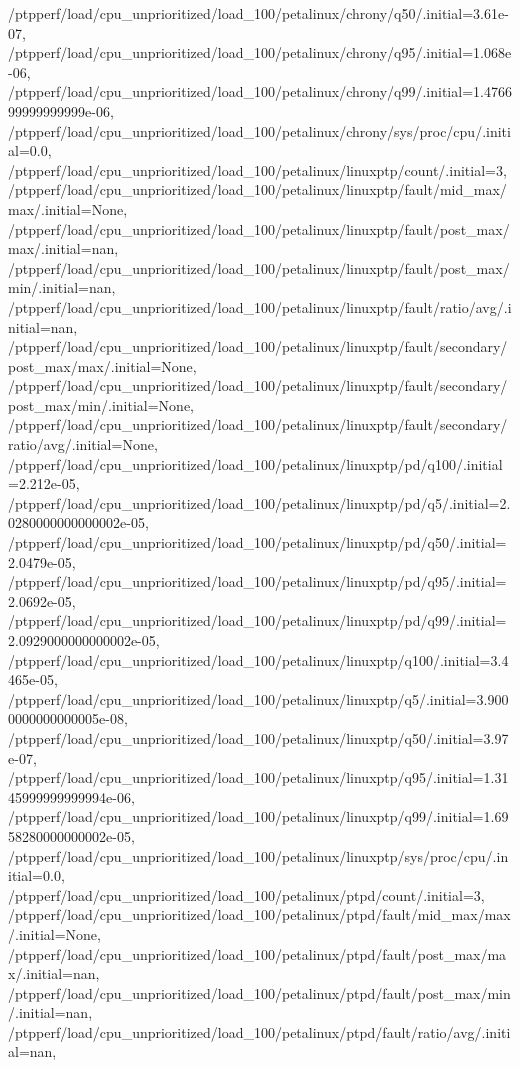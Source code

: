 {    /ptpperf/load/cpu_unprioritized/load_100/petalinux/chrony/q50/.initial=3.61e-07,
    /ptpperf/load/cpu_unprioritized/load_100/petalinux/chrony/q95/.initial=1.068e-06,
    /ptpperf/load/cpu_unprioritized/load_100/petalinux/chrony/q99/.initial=1.476699999999999e-06,
    /ptpperf/load/cpu_unprioritized/load_100/petalinux/chrony/sys/proc/cpu/.initial=0.0,
    /ptpperf/load/cpu_unprioritized/load_100/petalinux/linuxptp/count/.initial=3,
    /ptpperf/load/cpu_unprioritized/load_100/petalinux/linuxptp/fault/mid_max/max/.initial=None,
    /ptpperf/load/cpu_unprioritized/load_100/petalinux/linuxptp/fault/post_max/max/.initial=nan,
    /ptpperf/load/cpu_unprioritized/load_100/petalinux/linuxptp/fault/post_max/min/.initial=nan,
    /ptpperf/load/cpu_unprioritized/load_100/petalinux/linuxptp/fault/ratio/avg/.initial=nan,
    /ptpperf/load/cpu_unprioritized/load_100/petalinux/linuxptp/fault/secondary/post_max/max/.initial=None,
    /ptpperf/load/cpu_unprioritized/load_100/petalinux/linuxptp/fault/secondary/post_max/min/.initial=None,
    /ptpperf/load/cpu_unprioritized/load_100/petalinux/linuxptp/fault/secondary/ratio/avg/.initial=None,
    /ptpperf/load/cpu_unprioritized/load_100/petalinux/linuxptp/pd/q100/.initial=2.212e-05,
    /ptpperf/load/cpu_unprioritized/load_100/petalinux/linuxptp/pd/q5/.initial=2.0280000000000002e-05,
    /ptpperf/load/cpu_unprioritized/load_100/petalinux/linuxptp/pd/q50/.initial=2.0479e-05,
    /ptpperf/load/cpu_unprioritized/load_100/petalinux/linuxptp/pd/q95/.initial=2.0692e-05,
    /ptpperf/load/cpu_unprioritized/load_100/petalinux/linuxptp/pd/q99/.initial=2.0929000000000002e-05,
    /ptpperf/load/cpu_unprioritized/load_100/petalinux/linuxptp/q100/.initial=3.4465e-05,
    /ptpperf/load/cpu_unprioritized/load_100/petalinux/linuxptp/q5/.initial=3.9000000000000005e-08,
    /ptpperf/load/cpu_unprioritized/load_100/petalinux/linuxptp/q50/.initial=3.97e-07,
    /ptpperf/load/cpu_unprioritized/load_100/petalinux/linuxptp/q95/.initial=1.3145999999999994e-06,
    /ptpperf/load/cpu_unprioritized/load_100/petalinux/linuxptp/q99/.initial=1.6958280000000002e-05,
    /ptpperf/load/cpu_unprioritized/load_100/petalinux/linuxptp/sys/proc/cpu/.initial=0.0,
    /ptpperf/load/cpu_unprioritized/load_100/petalinux/ptpd/count/.initial=3,
    /ptpperf/load/cpu_unprioritized/load_100/petalinux/ptpd/fault/mid_max/max/.initial=None,
    /ptpperf/load/cpu_unprioritized/load_100/petalinux/ptpd/fault/post_max/max/.initial=nan,
    /ptpperf/load/cpu_unprioritized/load_100/petalinux/ptpd/fault/post_max/min/.initial=nan,
    /ptpperf/load/cpu_unprioritized/load_100/petalinux/ptpd/fault/ratio/avg/.initial=nan,
}
